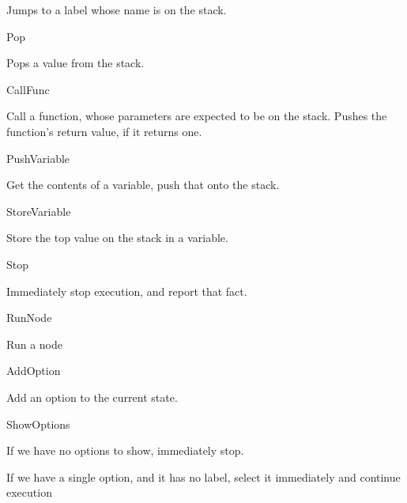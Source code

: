 Jumps to a label whose name is on the stack.


\begin{DoxyItemize}
\item Pop
\end{DoxyItemize}

Pops a value from the stack.


\begin{DoxyItemize}
\item Call\-Func
\end{DoxyItemize}

Call a function, whose parameters are expected to be on the stack. Pushes the function's return value, if it returns one.


\begin{DoxyItemize}
\item Push\-Variable
\end{DoxyItemize}

Get the contents of a variable, push that onto the stack.


\begin{DoxyItemize}
\item Store\-Variable
\end{DoxyItemize}

Store the top value on the stack in a variable.


\begin{DoxyItemize}
\item Stop
\end{DoxyItemize}

Immediately stop execution, and report that fact.


\begin{DoxyItemize}
\item Run\-Node
\end{DoxyItemize}

Run a node


\begin{DoxyItemize}
\item Add\-Option
\end{DoxyItemize}

Add an option to the current state.


\begin{DoxyItemize}
\item Show\-Options
\end{DoxyItemize}

If we have no options to show, immediately stop.

If we have a single option, and it has no label, select it immediately and continue execution


